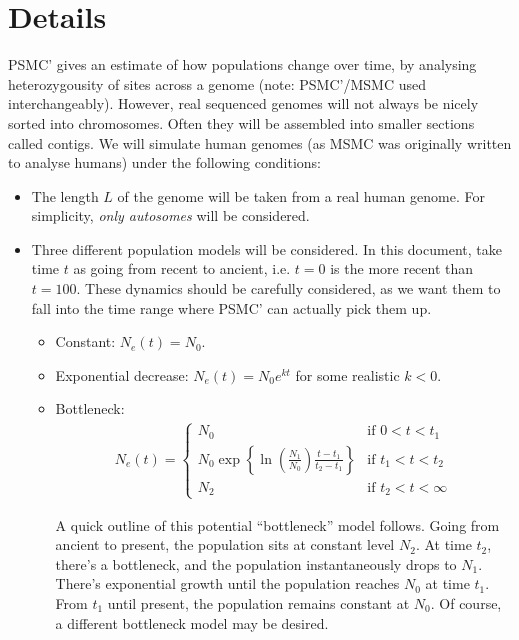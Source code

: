 \documentclass[11pt,a4paper]{article}
\begin{document}
\section{Details}
PSMC' gives an estimate of how populations change over time, by analysing heterozygousity of sites across a genome (note: PSMC'/MSMC used interchangeably). However, real sequenced genomes will not always be nicely sorted into chromosomes. Often they will be assembled into smaller sections called contigs. We will simulate human genomes (as MSMC was originally written to analyse humans) under the following conditions:
\begin{itemize}
\item The length $L$ of the genome will be taken from a real human genome. For simplicity, \emph{only autosomes} will be considered.
\item Three different population models will be considered. In this document, take time $t$ as going from recent to ancient, i.e. $t=0$ is the more recent than $t=100$. These dynamics should be carefully considered, as we want them to fall into the time range where PSMC' can actually pick them up.
\begin{itemize}
\item Constant: $N_e(t)=N_0$.
\item Exponential decrease: $N_e(t)=N_0e^{kt}$ for some realistic $k<0$.
\item Bottleneck:
\begin{align*}
  N_e(t) = \begin{cases}
      N_0 & \text{if $0 < t < t_1$} \\
      N_0\exp\left\{\ln(\frac{N_1}{N_0}) \frac{t-t_1}{t_2-t_1} \right\} & \text{if $t_1 < t < t_2$}\\
      N_2 & \text{if $t_2 < t < \infty$}
    \end{cases}
\end{align*}

  A quick outline of this potential ``bottleneck'' model follows. Going from ancient to present, the population sits at constant level $N_2$. At time $t_2$, there's a bottleneck, and the population instantaneously drops to $N_1$. There's exponential growth until the population reaches $N_0$ at time $t_1$. From $t_1$ until present, the population remains constant at $N_0$. Of course, a different bottleneck model may be desired.
\end{itemize}
\end{itemize}
\end{document}
